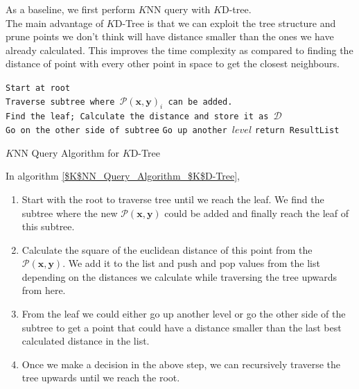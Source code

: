 As a baseline, we first perform $K$NN query with $K$D-tree.\\
The main advantage of $K$D-Tree is that we can exploit the tree structure and prune points we don't think will have distance smaller than the ones we have already calculated. This improves the time complexity as compared to finding the distance of point with every other point in space to get the closest neighbours. 


\begin{algorithm}[H]
    \SetAlgoLined
    {
        \texttt{Start at root}\\
        \texttt{Traverse subtree where $\mathcal{P}(\boldsymbol{x}, \boldsymbol{y})_i$ can be added.}\\
        \texttt{Find the leaf; Calculate the distance and store it as $\mathcal{D}$}\\
            {
                    {
                        \texttt{Go on the other side of subtree} 
                    }
                        {
                            \texttt{Go up another $level$}
                        }
            }
            {
                \texttt{return ResultList}
            }
        
    }
    \caption{$K$NN Query Algorithm for $K$D-Tree}
    \label{$K$NN_Query_Algorithm_$K$D-Tree}
\end{algorithm}

In algorithm \ref{$K$NN_Query_Algorithm_$K$D-Tree},
\begin{enumerate}
    \item Start with the root to traverse tree until we reach the leaf. We find the subtree where the new $\mathcal{P}(\boldsymbol{x}, \boldsymbol{y})$ could be added and finally reach the leaf of this subtree. 

    \item Calculate the square of the euclidean distance of this point from the $\mathcal{P}(\boldsymbol{x}, \boldsymbol{y})$. We add it to the list and push and pop values from the list depending on the distances we calculate while traversing the tree upwards from here.
    
    \item From the leaf we could either go up another level or go the other side of the subtree to get a point that could have a distance smaller than the last best calculated distance in the list. 
    
    \item Once we make a decision in the above step, we can recursively traverse the tree upwards until we reach the root. 
\end{enumerate}


